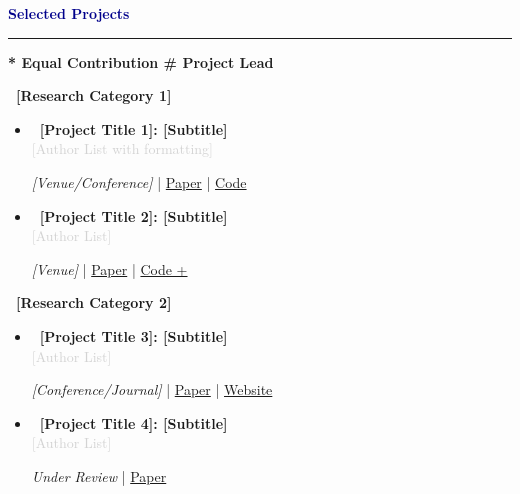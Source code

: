 \documentclass[11pt, a4paper]{article}
\newcommand{\sectioncolor}[1]{\textcolor{darkblue}{#1}}
\newcommand{\secondarycolor}[1]{\textcolor{lightgray}{#1}}
\newcommand{\cvsection}[1]{
    \vspace{10pt}
    {\Large\bfseries\sectioncolor{#1}}
    \vspace{2pt}
    \hrule height 1pt
    \vspace{8pt}
}
\newenvironment{projectentry}[3]{
    \vspace{10pt}
    \textbf{#1} \\
    \secondarycolor{#2} \\
    #3
    \vspace{6pt}
}{}
\begin{document}
\begin{minipage}[t]{0.7\textwidth}
\cvsection{Selected Projects}

\textbf{* Equal Contribution \quad \# Project Lead}

\vspace{8pt}

{\color{darkblue}\textbf{\faSpade\ [Research Category 1]}}

\begin{itemize}[leftmargin=0pt, itemsep=8pt]
    \item \begin{projectentry}
        {\faFire\ [Project Title 1]: [Subtitle]}
        {[Author List with formatting]}
        {[Brief project description and key contributions.]}
        \end{projectentry}
        \textit{[Venue/Conference]} | \href{https://paper-link.com}{Paper} | \href{https://github.com/username/repo}{Code}
        
    \item \begin{projectentry}
        {\faRocket\ [Project Title 2]: [Subtitle]}
        {[Author List]}
        {[Project description and impact.]}
        \end{projectentry}
        \textit{[Venue]} | \href{https://paper-link.com}{Paper} | \href{https://github.com/username/repo}{Code +}
\end{itemize}

\vspace{10pt}

{\color{darkblue}\textbf{\faSpade\ [Research Category 2]}}

\begin{itemize}[leftmargin=0pt, itemsep=8pt]
    \item \begin{projectentry}
        {\faBolt\ [Project Title 3]: [Subtitle]}
        {[Author List]}
        {[Description of the third project.]}
        \end{projectentry}
        \textit{[Conference/Journal]} | \href{https://paper-link.com}{Paper} | \href{https://project-website.com}{Website}
        
    \item \begin{projectentry}
        {\faUser\ [Project Title 4]: [Subtitle]}
        {[Author List]}
        {[Description focusing on key innovations and results.]}
        \end{projectentry}
        \textit{Under Review} | \href{https://paper-link.com}{Paper}
\end{itemize}

\end{minipage}%
\end{document}
